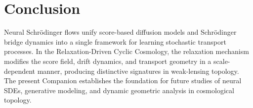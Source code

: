 \documentclass[11pt,a4paper]{article}
\begin{document}
\section{Conclusion}

Neural Schrödinger flows unify score-based diffusion models and Schrödinger bridge 
dynamics into a single framework for learning stochastic transport processes. In 
the Relaxation-Driven Cyclic Cosmology, the relaxation mechanism modifies the 
score field, drift dynamics, and transport geometry in a scale-dependent manner, 
producing distinctive signatures in weak-lensing topology. The present Companion 
establishes the foundation for future studies of neural SDEs, generative modeling, 
and dynamic geometric analysis in cosmological topology.


\nocite{*}

\end{document}
